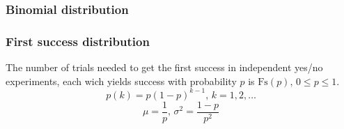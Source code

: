     
    
    
    
    
    \subsubsection{Binomial distribution}
    
    \subsubsection{First success distribution}
    The number of trials needed to get the first success in independent yes/no experiments, each wich yields success with probability $p$ is $\textrm{Fs}(p),\,0\leq p\leq1$.
    \[p(k)=p(1-p)^{k-1},\,k=1,2,\dots\]
    \[\mu = \frac1p,\,\sigma^2=\frac{1-p}{p^2}\]
    
